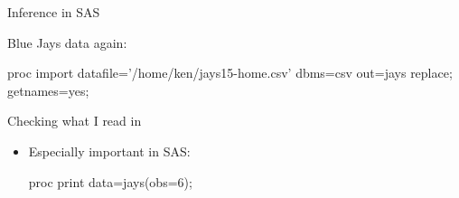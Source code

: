 \documentclass[unknownkeysallowed]{beamer}\usepackage[]{graphicx}\usepackage[]{color}
\begin{document}
\begin{frame}[fragile]{Inference in SAS}
  
  Blue Jays data again:
  
  \begin{Datastep}
proc import
  datafile='/home/ken/jays15-home.csv'
    dbms=csv
    out=jays
    replace;
  getnames=yes;
  \end{Datastep}
  
\end{frame}

\begin{frame}[fragile]{Checking what I read in}
  
  \begin{itemize}
  \item Especially important in SAS:
    
    \begin{Sascode}[store=iza]
proc print data=jays(obs=6);      
    \end{Sascode}
    
  \end{itemize}
  
\end{frame}
\end{document}
